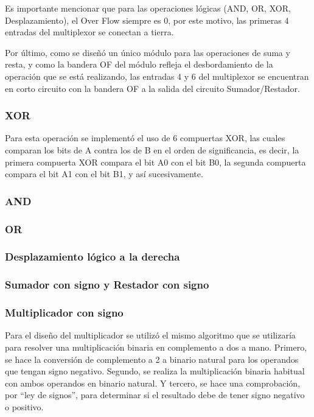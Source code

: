 \documentclass[journal,trans]{IEEEtran}
\begin{document}
Es importante mencionar que para las operaciones lógicas (AND, OR, XOR, Desplazamiento), el Over Flow siempre es 0, por este motivo, las primeras 4 entradas del multiplexor se conectan a tierra. 

Por último, como se diseñó un único módulo para las operaciones de suma y resta, y como la bandera OF del módulo refleja el desbordamiento de la operación que se está realizando, las entradas 4 y 6 del multiplexor se encuentran en corto circuito con la bandera OF a la salida del circuito Sumador/Restador.

\subsubsection{XOR}
Para esta operación se implementó el uso de 6 compuertas XOR, las cuales comparan los bits de A contra los de B en el orden de significancia, es decir, la primera compuerta XOR compara el bit A0 con el bit B0, la segunda compuerta compara el bit A1 con el bit B1, y así sucesivamente.

\subsubsection{AND}

\subsubsection{OR}

\subsubsection{Desplazamiento lógico a la derecha}

\subsubsection{Sumador con signo y Restador con signo}

\subsubsection{Multiplicador con signo}
Para el diseño del multiplicador se utilizó el mismo algoritmo que se utilizaría para resolver una multiplicación binaria en complemento a dos a mano. Primero, se hace la conversión de complemento a 2 a binario natural para los operandos que tengan signo negativo. Segundo, se realiza la multiplicación binaria habitual con ambos operandos en binario natural. Y tercero, se hace una comprobación, por “ley de signos”, para determinar si el resultado debe de tener signo negativo o positivo.
\end{document}
